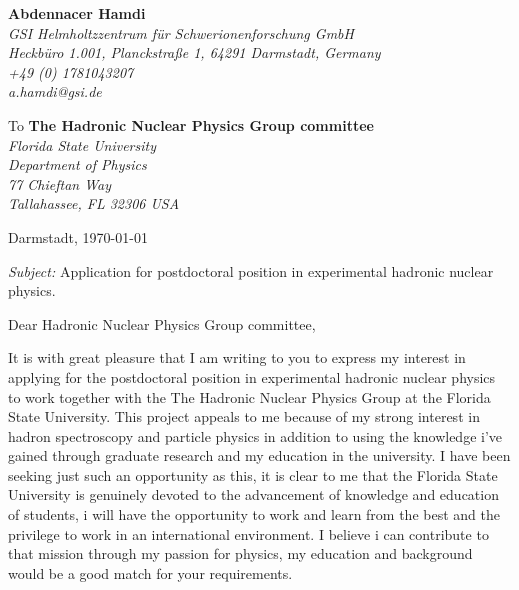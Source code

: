 \documentclass[11pt]{letter}
\begin{document}
 \sffamily
 \hfill
 \begin{flushleft}
 {\bfseries Abdennacer Hamdi}\\[.35ex]
 \small\itshape
 GSI Helmholtzzentrum f\"ur Schwerionenforschung GmbH\\
 Heckb\"uro 1.001, Planckstraße 1, 64291 Darmstadt, Germany\\[.35ex]
 +49 (0) 1781043207\\
 a.hamdi@gsi.de
 \end{flushleft}
 \begin{flushleft}
 To {\bfseries The Hadronic Nuclear Physics Group committee}\\[.35ex]
 \small\itshape
 Florida State University \\
 Department of Physics \\
 77 Chieftan Way \\
 Tallahassee, FL  32306  USA

 \end{flushleft}
 \hfill
 \begin{flushleft}
 Darmstadt, \today \\
 
 \end{flushleft}
\textit{Subject:} Application for postdoctoral position in experimental hadronic nuclear physics.\\
\par Dear Hadronic Nuclear Physics Group committee,
~\par It is with great pleasure that I am writing to you to express my interest in applying for the postdoctoral position in experimental hadronic nuclear physics to work together with the The Hadronic Nuclear Physics Group at the Florida State University. This project appeals to me because of my strong interest in hadron spectroscopy and particle physics in addition to using the knowledge i’ve gained through graduate research and my education in the university. I have been seeking just such an opportunity as this, it is clear to me that the Florida State University is genuinely devoted to the advancement of knowledge and education of students, i will have the opportunity to work and learn from the best and the privilege to work in an international environment. I believe i can contribute to that mission through my passion for physics, my education and background would be a good match for your requirements.
\end{document}
